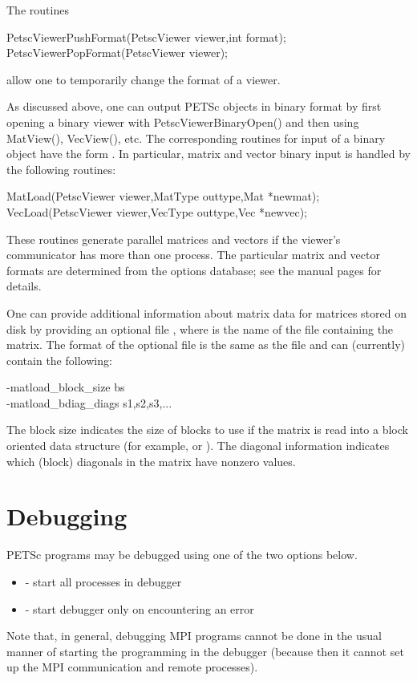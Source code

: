 {{{The routines
\begin{tabbing}
  PetscViewerPushFormat(PetscViewer viewer,int format);\\
  PetscViewerPopFormat(PetscViewer viewer);
\end{tabbing} 
allow one to temporarily change the format of a viewer.
 

As discussed above, one can output PETSc objects in binary format by
first opening a binary viewer with PetscViewerBinaryOpen() and
then using MatView(), VecView(), etc.  The corresponding
routines for input of a binary object have the form .  In
particular, matrix and vector binary input is handled by the
following routines:  
\begin{tabbing}
  MatLoad(PetscViewer viewer,MatType outtype,Mat *newmat);\\
  VecLoad(PetscViewer viewer,VecType outtype,Vec *newvec);
\end{tabbing}
These routines generate parallel matrices and vectors if the viewer's
communicator has more than one process.  The particular matrix and
vector formats are determined from the options database; see the
manual pages for details.

One can provide additional information about matrix data for matrices
stored on disk by providing an optional file ,
where  is the name of the file containing the matrix.
The format of the optional file is the same as the  file 
and can (currently) contain the following:
\begin{tabbing}
   -matload\_block\_size \trl{<}bs\trl{>}\\
   -matload\_bdiag\_diags \trl{<}s1,s2,s3,...\trl{>}
\end{tabbing}
The block size indicates the size of blocks to use if the matrix is
read into a block oriented data structure (for example, 
 or ). The diagonal information 
 indicates
which (block) diagonals in the matrix have nonzero values.

\section{Debugging}  \label{sec_debugging}

PETSc programs may be debugged using one of the two options below.
\begin{itemize}
\item {}   
     - start all processes in debugger
\item {} 
       - start debugger only on encountering an error
\end{itemize}
Note that, in general, debugging MPI programs cannot be done in the usual
manner of starting the programming in the debugger (because then it cannot
set up the MPI communication and remote processes).

}}}

